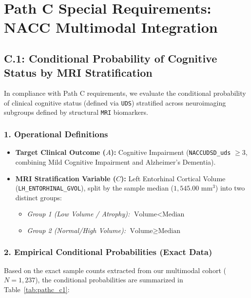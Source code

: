 \documentclass[11pt, a4paper]{article}
\begin{document}
\section*{Path C Special Requirements: NACC Multimodal Integration}

\subsection{C.1: Conditional Probability of Cognitive Status by MRI Stratification}
In compliance with Path C requirements, we evaluate the conditional probability of clinical cognitive status (defined via \texttt{UDS}) stratified across neuroimaging subgroups defined by structural \texttt{MRI} biomarkers.

\subsubsection*{1. Operational Definitions}
\begin{itemize}
    \item \textbf{Target Clinical Outcome ($A$):} Cognitive Impairment (\texttt{NACCUDSD\_uds} $\ge 3$, combining Mild Cognitive Impairment and Alzheimer's Dementia).
    \item \textbf{MRI Stratification Variable ($C$):} Left Entorhinal Cortical Volume (\texttt{LH\_ENTORHINAL\_GVOL}), split by the sample median ($1,545.00\text{ mm}^3$) into two distinct groups:
    \begin{itemize}
        \item \textit{Group 1 (Low Volume / Atrophy):} $\text{Volume} < \text{Median}$
        \item \textit{Group 2 (Normal/High Volume):} $\text{Volume} \ge \text{Median}$
    \end{itemize}
\end{itemize}

\subsubsection*{2. Empirical Conditional Probabilities (Exact Data)}
Based on the exact sample counts extracted from our multimodal cohort ($N = 1,237$), the conditional probabilities are summarized in Table~\ref{tab:pathc_c1}:
\end{document}
